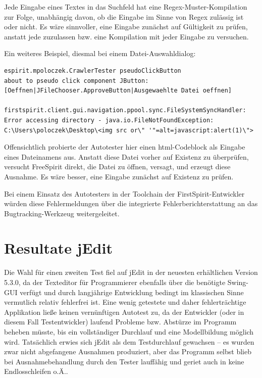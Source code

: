 Jede Eingabe eines Textes in das Suchfeld hat eine Regex-Muster-Kompilation
zur Folge, unabhängig davon, ob die Eingabe im Sinne von Regex zulässig ist
oder nicht. Es wäre sinnvoller, eine Eingabe zunächst auf Gültigkeit zu prüfen,
anstatt jede zuzulassen bzw. eine Kompilation mit jeder Eingabe zu versuchen.

Ein weiteres Beispiel, diesmal bei einem Datei-Auswahldialog:

\begin{lstlisting}[float=!ht,label=fmjson,caption={Ausnahme FirstSpirit bei ungültiger Dateiangabe}]
espirit.mpoloczek.CrawlerTester pseudoClickButton
about to pseudo click component JButton:
[Oeffnen|JFileChooser.ApproveButton|Ausgewaehlte Datei oeffnen]

firstspirit.client.gui.navigation.ppool.sync.FileSystemSyncHandler:
Error accessing directory - java.io.FileNotFoundException:
C:\Users\poloczek\Desktop\<img src or\" '"=alt=javascript:alert(1)\">
\end{lstlisting}

Offensichtlich probierte der Autotester hier einen html-Codeblock als Eingabe eines Dateinamens
aus. Anstatt diese Datei vorher auf Existenz zu überprüfen, versucht FreeSpirit direkt,
die Datei zu öffnen, versagt, und erzeugt diese Ausnahme. Es wäre besser, eine
Eingabe zunächst auf Existenz zu prüfen.

Bei einem Einsatz des Autotesters in der Toolchain
der FirstSpirit-Entwickler würden diese
Fehlermeldungen über die integrierte Fehlerberichterstattung
an das Bugtracking-Werkzeug weitergeleitet.


\section{Resultate jEdit}\label{section:testresultsjedit}

Die Wahl für einen zweiten Test fiel auf jEdit
in der neuesten erhältlichen Version 5.3.0,
da der \glqq{}Texteditor für Programmierer\grqq{}
ebenfalls über die benötigte Swing-GUI verfügt und 
durch langjährige Entwicklung bedingt im klassischen
Sinne vermutlich relativ fehlerfrei ist. Eine wenig getestete und daher fehlerträchtige
Applikation ließe keinen vernünftigen Autotest zu, da der Entwickler (oder in diesem Fall
Testentwickler) laufend Probleme bzw. Abstürze im Programm beheben müsste, bis ein vollständiger
Durchlauf und eine Modellbildung möglich wird. Tatsächlich erwies sich jEdit als
dem Testdurchlauf gewachsen -- es wurden zwar nicht abgefangene Ausnahmen produziert,
aber das Programm selbst blieb bei Ausnahmebehandlung durch den Tester lauffähig
und geriet auch in keine Endlosschleifen o.Ä..


